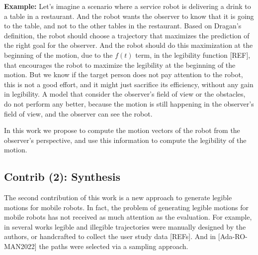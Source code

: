 \documentclass[11pt]{article}
\begin{document}
    \noindent
    \textbf{Example:}
    Let's imagine a scenario where a service robot is delivering a drink to a table in a restaurant.
    And the robot wants the observer to know that it is going to the table, and not to the other tables in the restaurant.
    Based on Dragan's definition, the robot should choose a trajectory that maximizes the prediction of the right goal for the observer.
    And the robot should do this maximization at the beginning of the motion, due to the $f(t)$ term, in the legibility function [REF],
    that encourages the robot to maximize the legibility at the beginning of the motion.
    But we know if the target person does not pay attention to the robot, this is not a good effort, and it might just sacrifice its efficiency, without any gain in legibility.
    A model that consider the observer's field of view or the obstacles, do not perform any better,
    because the motion is still happening in the observer's field of view, and the observer can see the robot.

    In this work we propose to compute the motion vectors of the robot from the observer's perspective,
    and use this information to compute the legibility of the motion.






    \noindent
    \subsection{Contrib (2): Synthesis} %
    The second contribution of this work is a new approach to generate legible motions for mobile robots.
    In fact, the problem of generating legible motions for mobile robots has not received as much attention as the evaluation.
    For example, in several works legible and illegible trajectories were manually designed by the authors,
    or handcrafted to collect the user study data [REFs].
    And in [Ada-RO-MAN2022] the paths were selected via a sampling approach.
\end{document}
